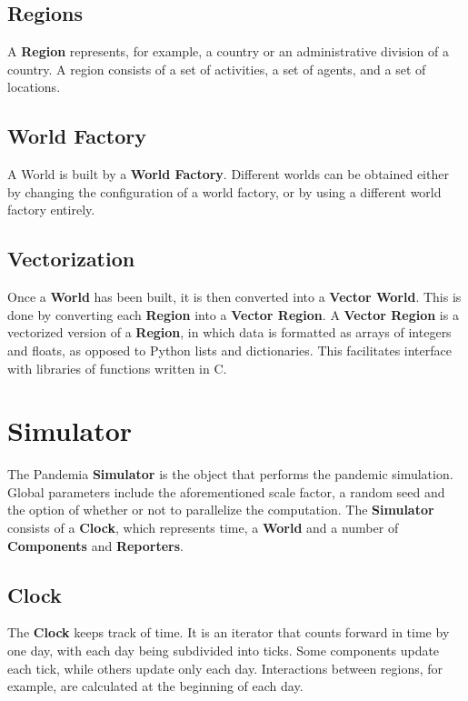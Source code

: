 \documentclass[10pt,letterpaper]{article}
\begin{document}
\subsection{Regions}
A \textbf{Region} represents, for example, a country or an administrative division of a country. A region consists of a set of activities, a set of agents, and a set of locations.

\subsection{World Factory}
A World is built by a \textbf{World Factory}. Different worlds can be obtained either by changing the configuration of a world factory, or by using a different world factory entirely.

\subsection{Vectorization}
Once a \textbf{World} has been built, it is then converted into a \textbf{Vector World}. This is done by converting each \textbf{Region} into a \textbf{Vector Region}. A \textbf{Vector Region} is a vectorized version of a \textbf{Region}, in which data is formatted as arrays of integers and floats, as opposed to Python lists and dictionaries. This facilitates interface with libraries of functions written in C.

\section{Simulator}

The Pandemia \textbf{Simulator} is the object that performs the pandemic simulation. Global parameters include the aforementioned scale factor, a random seed and the option of whether or not to parallelize the computation. The \textbf{Simulator} consists of a \textbf{Clock}, which represents time, a \textbf{World} and a number of \textbf{Components} and \textbf{Reporters}.

\subsection{Clock}

The \textbf{Clock} keeps track of time. It is an iterator that counts forward in time by one day, with each day being subdivided into ticks. Some components update each tick, while others update only each day. Interactions between regions, for example, are calculated at the beginning of each day.
\end{document}
